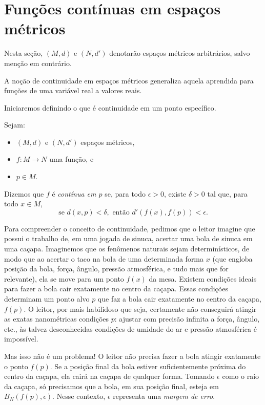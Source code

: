 
\section{Funções contínuas em espaços métricos}

Nesta seção, $(M, d)$ e $(N, d')$ denotarão espaços métricos arbitrários, salvo menção em contrário.

A noção de continuidade em espaços métricos generaliza aquela aprendida para funções de uma variável real a valores reais.

Iniciaremos definindo o que é continuidade em um ponto específico.

\begin{definition}
    Sejam:
    \begin{itemize}
        \item $(M, d)$ e $(N, d')$ espaços métricos,
        \item $f: M \to N$ uma função, e
        \item $p\in M$.
    \end{itemize}

    Dizemos que $f$ é \emph{contínua em $p$} se, para todo $\epsilon > 0$, existe $\delta > 0$ tal que, para todo $x \in M$,
    \[
        \text{se } d(x, p) < \delta, \text{ então } d'(f(x), f(p)) < \epsilon.
    \]
\end{definition}

Para compreender o conceito de continuidade, pedimos que o leitor imagine que possui o trabalho de, em uma jogada de sinuca, acertar uma bola de sinuca em uma caçapa.
Imaginemos que os fenômenos naturais sejam determinísticos, de modo que ao acertar o taco na bola de uma determinada forma $x$ (que engloba posição da bola, força, ângulo, pressão atmosférica, e tudo mais que for relevante), ela se move para um ponto $f(x)$ da mesa.
Existem condições ideais para fazer a bola cair exatamente no centro da caçapa.
Essas condições determinam um ponto alvo $p$ que faz a bola cair exatamente no centro da caçapa, $f(p)$.
O leitor, por mais habilidoso que seja, certamente não conseguirá atingir as exatas nanométricas condições $p$: ajustar com precisão infinita a força, ângulo, etc., às talvez desconhecidas condições de umidade do ar e pressão atmosférica é impossível.

Mas isso não é um problema!
O leitor não precisa fazer a bola atingir exatamente o ponto $f(p)$.
Se a posição final da bola estiver suficientemente próxima do centro da caçapa, ela cairá na caçapa de qualquer forma.
Tomando $\epsilon$ como o raio da caçapa, só precisamos que a bola, em sua posição final, esteja em $B_N(f(p), \epsilon)$.
Nesse contexto, $\epsilon$ representa uma \emph{margem de erro}.

